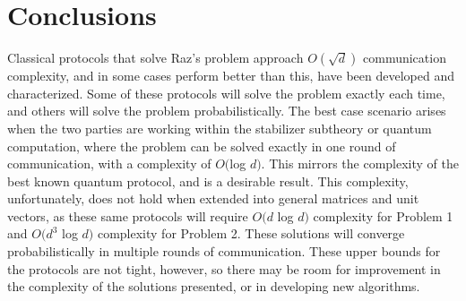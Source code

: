 \documentclass[../3Wworkreport.tex]{subfiles}
\begin{document}
\chapter{Conclusions}
\label{chap:conclusions}

Classical protocols that solve Raz's problem approach $O(\sqrt{d})$ communication complexity, and in some cases perform better than this, have been developed and characterized. Some of these protocols will solve the problem exactly each time, and others will solve the problem probabilistically. The best case scenario arises when the two parties are working within the stabilizer subtheory or quantum computation, where the problem can be solved exactly in one round of communication, with a complexity of $O($log $d)$. This mirrors the complexity of the best known quantum protocol, and is a desirable result. This complexity, unfortunately, does not hold when extended into general matrices and unit vectors, as these same protocols will require $O(d$ log $d)$ complexity for Problem 1 and $O(d^3$ log $d)$ complexity for Problem 2. These solutions will converge probabilistically in multiple rounds of communication. These upper bounds for the protocols are not tight, however, so there may be room for improvement in the complexity of the solutions presented, or in developing new algorithms.
\end{document}
